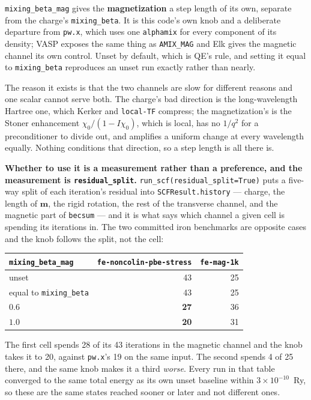 \documentclass[11pt,a4paper]{article}
\newcommand{\code}[1]{\texttt{\small #1}}
\begin{document}
\code{mixing\_beta\_mag} gives the \textbf{magnetization} a step length of its
own, separate from the charge's \code{mixing\_beta}. It is this code's own knob
and a deliberate departure from \code{pw.x}, which uses one \code{alphamix} for
every component of its density; VASP exposes the same thing as \code{AMIX\_MAG}
and Elk gives the magnetic channel its own control. Unset by default, which is
QE's rule, and setting it equal to \code{mixing\_beta} reproduces an unset run
exactly rather than nearly.

The reason it exists is that the two channels are slow for different reasons and
one scalar cannot serve both. The charge's bad direction is the long-wavelength
Hartree one, which Kerker and \code{local-TF} compress; the magnetization's is
the Stoner enhancement $\chi_0/(1 - I\chi_0)$, which is local, has no $1/q^2$
for a preconditioner to divide out, and amplifies a uniform change at every
wavelength equally. Nothing conditions that direction, so a step length is all
there is.

\textbf{Whether to use it is a measurement rather than a preference, and the
measurement is \code{residual\_split}.} \code{run\_scf(residual\_split=True)}
puts a five-way split of each iteration's residual into
\code{SCFResult.history} --- charge, the length of $\mathbf m$, the rigid
rotation, the rest of the transverse channel, and the magnetic part of
\code{becsum} --- and it is what says which channel a given cell is spending its
iterations in. The two committed iron benchmarks are opposite cases and the knob
follows the split, not the cell:

\begin{center}
\begin{tabular}{lrr}
\toprule
\code{mixing\_beta\_mag} & \code{fe-noncolin-pbe-stress} & \code{fe-mag-1k} \\
\midrule
unset & 43 & 25 \\
equal to \code{mixing\_beta} & 43 & 25 \\
$0.6$ & \textbf{27} & 36 \\
$1.0$ & \textbf{20} & 31 \\
\bottomrule
\end{tabular}
\end{center}

The first cell spends 28 of its 43 iterations in the magnetic channel and the
knob takes it to 20, against \code{pw.x}'s 19 on the same input. The second
spends 4 of 25 there, and the same knob makes it a third \emph{worse}. Every run
in that table converged to the same total energy as its own unset baseline within
$3\times 10^{-10}$~Ry, so these are the same states reached sooner or later and
not different ones.
\end{document}
